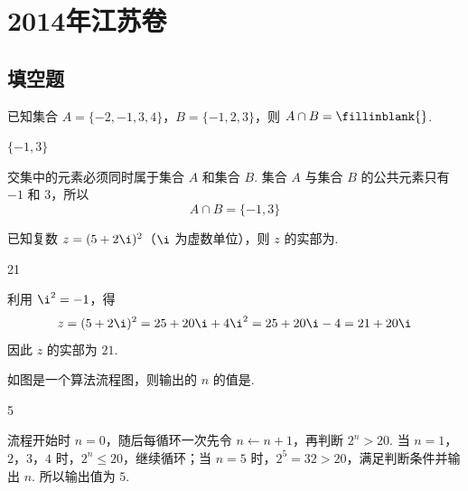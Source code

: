 \chapter{2014年江苏卷}

\section{填空题}

\begin{problem}
已知集合 \(A = \{-2, -1, 3, 4\}\)，\(B = \{-1, 2, 3\}\)，则 \(A \cap B =\fillinblank{}\).
\end{problem}

\begin{answer}
\(\{-1,3\}\)
\end{answer}

\begin{solution}
交集中的元素必须同时属于集合 \(A\) 和集合 \(B\). 集合 \(A\) 与集合 \(B\) 的公共元素只有 \(-1\) 和 \(3\)，所以
\[
A\cap B=\{-1,3\}
\]
\end{solution}

\begin{problem}
已知复数 \(z = (5 + 2\i)^2\)（\(\i\) 为虚数单位），则 \(z\) 的实部为\fillinblank{}.
\end{problem}

\begin{answer}
21
\end{answer}

\begin{solution}
利用 \(\i^2=-1\)，得
\[
z=(5+2\i)^2=25+20\i+4\i^2=25+20\i-4=21+20\i
\]
因此 \(z\) 的实部为 \(21\).
\end{solution}

\begin{problem}
如图是一个算法流程图，则输出的 \(n\) 的值是\fillinblank{}.

\end{problem}

\begin{answer}
5
\end{answer}

\begin{solution}
流程开始时 \(n=0\)，随后每循环一次先令 \(n\leftarrow n+1\)，再判断 \(2^n>20\). 当 \(n=1\)，\(2\)，\(3\)，\(4\) 时，\(2^n\leqslant20\)，继续循环；当 \(n=5\) 时，\(2^5=32>20\)，满足判断条件并输出 \(n\). 所以输出值为 \(5\).
\end{solution}

